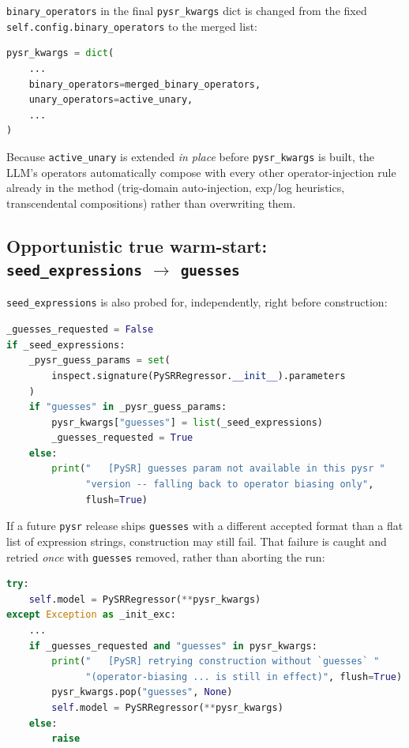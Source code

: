 \documentclass[11pt]{article}
\begin{document}
\texttt{binary\_operators} in the final \texttt{pysr\_kwargs} dict is changed from the fixed
\texttt{self.config.binary\_operators} to the merged list:

\begin{lstlisting}[language=Python]
pysr_kwargs = dict(
    ...
    binary_operators=merged_binary_operators,
    unary_operators=active_unary,
    ...
)
\end{lstlisting}

Because \texttt{active\_unary} is extended \emph{in place} before \texttt{pysr\_kwargs} is built,
the LLM's operators automatically compose with every other operator-injection rule already in the
method (trig-domain auto-injection, exp/log heuristics, transcendental compositions) rather than
overwriting them.

\subsection{Opportunistic true warm-start: \texttt{seed\_expressions} $\to$ \texttt{guesses}}

\texttt{seed\_expressions} is also probed for, independently, right before construction:

\begin{lstlisting}[language=Python, caption={Runtime probe for \texttt{guesses}, with safe fallback}]
_guesses_requested = False
if _seed_expressions:
    _pysr_guess_params = set(
        inspect.signature(PySRRegressor.__init__).parameters
    )
    if "guesses" in _pysr_guess_params:
        pysr_kwargs["guesses"] = list(_seed_expressions)
        _guesses_requested = True
    else:
        print("   [PySR] guesses param not available in this pysr "
              "version -- falling back to operator biasing only",
              flush=True)
\end{lstlisting}

If a future \texttt{pysr} release ships \texttt{guesses} with a different accepted format than a flat
list of expression strings, construction may still fail. That failure is caught and retried
\emph{once} with \texttt{guesses} removed, rather than aborting the run:

\begin{lstlisting}[language=Python, caption={Retry-without-\texttt{guesses} on construction failure}]
try:
    self.model = PySRRegressor(**pysr_kwargs)
except Exception as _init_exc:
    ...
    if _guesses_requested and "guesses" in pysr_kwargs:
        print("   [PySR] retrying construction without `guesses` "
              "(operator-biasing ... is still in effect)", flush=True)
        pysr_kwargs.pop("guesses", None)
        self.model = PySRRegressor(**pysr_kwargs)
    else:
        raise
\end{lstlisting}
\end{document}
